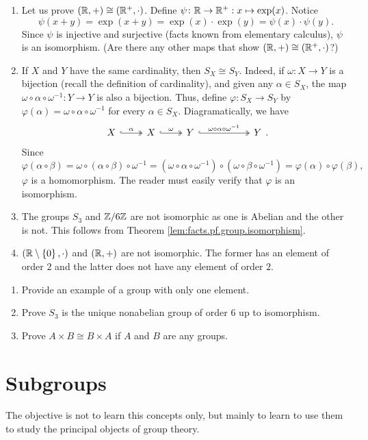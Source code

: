 \documentclass[11pt,a4paper]{article}
\begin{document}
\begin{exa}
\begin{enumerate}[label=(\roman*)]
    \item Let us prove \(\left( \mathbb{R}, +  \right)\cong \left( \mathbb{R}^+, \cdot \right)\).
    Define \(\psi\colon \mathbb{R}\to \mathbb{R}^+:x\mapsto \exp(x)\). 
    Notice \[\psi(x + y) = \exp(x+y) = \exp(x)\cdot\exp(y) = \psi(x)\cdot\psi(y).\]
    Since \(\psi\) is injective and surjective (facts known from elementary calculus), \(\psi\) is an isomorphism.
    (Are there any other maps that show \(\left( \mathbb{R}, +  \right)\cong \left( \mathbb{R}^+, \cdot \right)\)?)
    \item If \(X\) and \(Y\) have the same cardinality, then \(S_X\cong S_Y\).
    Indeed, if \(\omega \colon X\to Y\) is a bijection (recall the definition of cardinality), and
    given any \(\alpha\in S_X\), 
    the map \(\omega \circ \alpha\circ \omega^{-1}\colon Y\to Y \) is also a bijection.
    Thus, define \(\varphi\colon S_X\to S_Y\) by \(\varphi(\alpha) = \omega \circ \alpha\circ \omega^{-1}\) for every \(\alpha\in S_X\).
    Diagramatically, we have
    \[\begin{tikzcd}
X \arrow[r, "\alpha", two heads, hook] & X \arrow[r, "\omega", two heads, hook] & Y \arrow[r, "\omega\circ \alpha\circ \omega^{-1}", two heads, hook] &[3em] Y
\end{tikzcd}.\]
    Since \[\varphi(\alpha\circ \beta) = \omega \circ (\alpha\circ\beta)\circ \omega^{-1}= (\omega \circ \alpha\circ \omega^{-1})\circ(\omega\circ\beta\circ \omega^{-1}) = \varphi(\alpha)\circ \varphi(\beta),\]
    \(\varphi\) is a homomorphism.
    The reader must easily verify that \(\varphi\) is an isomorphism.

    \item The groups \(S_3\) and \(\mathbb{Z}/6\mathbb{Z}\) are not isomorphic as one is Abelian and the other is not. This follows from Theorem \ref{lem:facts.pf.group.isomorphism}.
    
    \item \(\left( \mathbb{R}\setminus \left\{ 0 \right\}, \cdot \right) \) and \(\left( \mathbb{R},+ \right)\) are not isomorphic.
    The former  has an element of  order \(2\) and the latter does not have any element of order \(2\).
\end{enumerate}
\end{exa}

\begin{eje}
\begin{enumerate}[label=(\roman*)]
    \item Provide an example of a group with only one element.
    \item Prove \(S_3\) is the unique nonabelian group of order \(6\) up to isomorphism.
    \item Prove \(A\times B\cong B\times A\) if \(A\) and \(B\) are any groups.
\end{enumerate}
\end{eje}



\section{Subgroups}


The objective is not to learn this concepts only, but mainly to learn to use them to study the principal objects of group theory.
\end{document}
